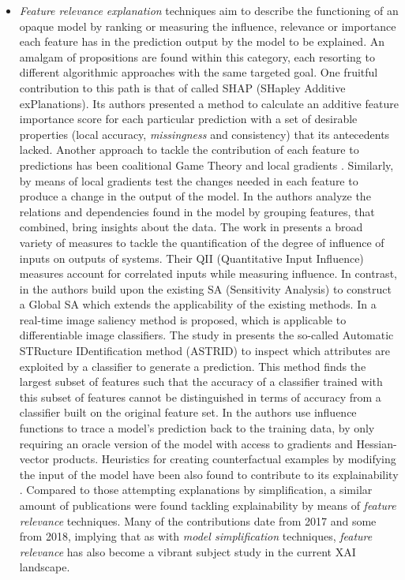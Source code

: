 \documentclass[final]{elsarticle}
\begin{document}
\begin{itemize}[leftmargin=*]
	\item \textit{Feature relevance explanation} techniques aim to describe the functioning of an opaque model by ranking or measuring the influence, relevance or importance each feature has in the prediction output by the model to be explained. An amalgam of propositions are found within this category, each resorting to different algorithmic approaches with the same targeted goal. One fruitful contribution to this path is that of \cite{lundberg2017unified} called SHAP (SHapley Additive exPlanations). Its authors presented a method to calculate an additive feature importance score for each particular prediction with a set of desirable properties (local accuracy, \textit{missingness} and consistency) that its antecedents lacked. Another approach to tackle the contribution of each feature to predictions has been coalitional Game Theory \cite{EfficientExplanation} and local gradients \cite{ExplainingClassifications}. Similarly, by means of local gradients \cite{IndividualClassificationDecisions} test the changes needed in each feature to produce a change in the output of the model. In \cite{ExploringByRandomization} the authors analyze the relations and dependencies found in the model by grouping features, that combined, bring insights about the data. The work in \cite{AlgorithmicTransparency} presents a broad variety of measures to tackle the quantification of the degree of influence of inputs on outputs of systems. Their QII (Quantitative Input Influence) measures account for correlated inputs while measuring influence. In contrast, in \cite{SensitivityAnalysis} the authors build upon the existing SA (Sensitivity Analysis) to construct a Global SA which extends the applicability of the existing methods. In \cite{RealTimeImageSaliency} a real-time image saliency method is proposed, which is applicable to differentiable image classifiers. The study in \cite{AtributeInteractions} presents the so-called Automatic STRucture IDentification method (ASTRID) to inspect which attributes are exploited by a classifier to generate a prediction. This method finds the largest subset of features such that the accuracy of a classifier trained with this subset of features cannot be distinguished in terms of accuracy from a classifier built on the original feature set. In \cite{ViaInfluence} the authors use influence functions to trace a model's prediction back to the training data, by only requiring an oracle version of the model with access to gradients and Hessian-vector products. Heuristics for creating counterfactual examples by modifying the input of the model have been also found to contribute to its explainability \cite{Martens:2014,chen2017enhancing}. Compared to those attempting explanations by simplification, a similar amount of publications were found tackling explainability by means of \textit{feature relevance} techniques. Many of the contributions date from 2017 and some from 2018, implying that as with \textit{model simplification} techniques, \textit{feature relevance} has also become a vibrant subject study in the current XAI landscape.
	

\end{itemize}
\end{document}
